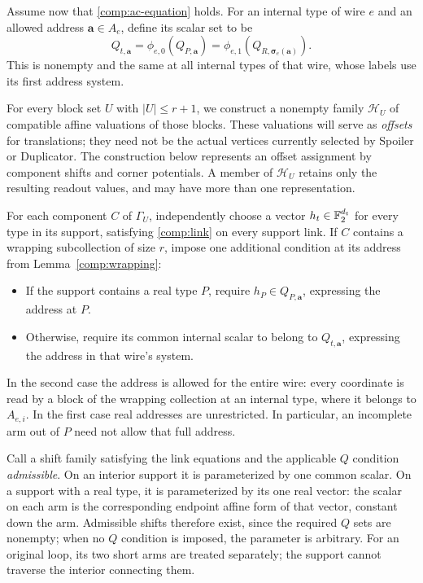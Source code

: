 Assume now that \eqref{comp:ac-equation} holds.  For an internal type of
wire $e$ and an allowed address $\mathbf a\in A_e$, define its scalar set
to be
\begin{equation}\label{comp:internal-q}
 Q_{t,\mathbf a}
   =\phi_{e,0}(Q_{P,\mathbf a})
   =\phi_{e,1}(Q_{R,\boldsymbol\sigma_e(\mathbf a)}).
\end{equation}
This is nonempty and the same at all internal types of that wire, whose
labels use its first address system.

For every block set $U$ with $|U|\leq r+1$, we construct a nonempty family
$\mathcal H_U$ of compatible affine valuations of those blocks.  These
valuations will serve as \emph{offsets} for translations; they need not
be the actual vertices currently selected by Spoiler or Duplicator.
The construction below represents an offset assignment by component
shifts and corner potentials.  A member of $\mathcal H_U$ retains only
the resulting readout values, and may have more than one representation.

For each component $C$ of $\Gamma_U$, independently choose a vector
$h_t\in\mathbb{F}_2^{d_t}$ for every type in its support, satisfying
\eqref{comp:link} on every support link.  If $C$ contains a wrapping
subcollection of size $r$, impose one additional condition at its address
from Lemma~\ref{comp:wrapping}:
\begin{itemize}
\item If the support contains a real type $P$, require
  $h_P\in Q_{P,\mathbf a}$, expressing the address at $P$.
\item Otherwise, require its common internal scalar to belong to
  $Q_{t,\mathbf a}$, expressing the address in that wire's system.
\end{itemize}
In the second case the address is allowed for the entire wire: every
coordinate is read by a block of the wrapping collection at an internal
type, where it belongs to $A_{e,i}$.  In the first case real addresses
are unrestricted.  In particular, an incomplete arm out of $P$ need
not allow that full address.

Call a shift family satisfying the link equations and the applicable
$Q$ condition \emph{admissible}.  On an interior support it is
parameterized by one common scalar.  On a support with a real type,
it is parameterized by its one real vector: the scalar on each arm is
the corresponding endpoint affine form of that vector, constant down
the arm.  Admissible shifts therefore exist, since the required $Q$
sets are nonempty; when no $Q$ condition is imposed, the parameter is
arbitrary.  For an original loop, its two short arms are treated
separately; the support cannot traverse the interior connecting them.

